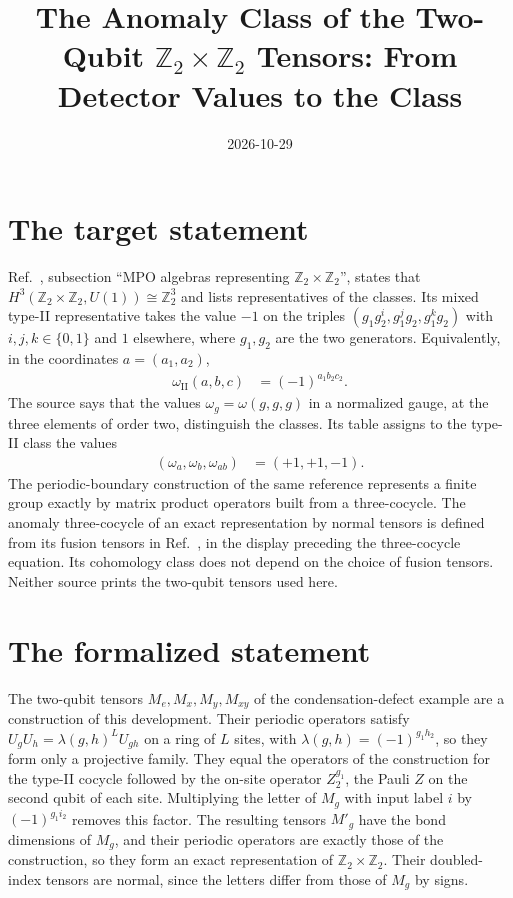 \documentclass{article}
\title{The Anomaly Class of the Two-Qubit $\mathbb{Z}_2\times\mathbb{Z}_2$
Tensors: From Detector Values to the Class}
\author{}
\date{2026-10-29}
\begin{document}
\maketitle
{}

\section{The target statement}

Ref.~\cite{GarreRubio2023MPOSym}, subsection ``MPO algebras representing
$\mathbb{Z}_2\times\mathbb{Z}_2$'', states that
$H^3(\mathbb{Z}_2\times\mathbb{Z}_2,U(1))\cong\mathbb{Z}_2^3$ and lists
representatives of the classes. Its mixed type-II representative takes the
value $-1$ on the triples $(g_1g_2^i,g_1^jg_2,g_1^kg_2)$ with
$i,j,k\in\{0,1\}$ and $1$ elsewhere, where $g_1,g_2$ are the two generators.
Equivalently, in the coordinates $a=(a_1,a_2)$,
\begin{align}
    \omega_{\mathrm{II}}(a,b,c)
     & =(-1)^{a_1b_2c_2}.
    \label{eq:glm23z2z2_type_two_cocycle}
\end{align}
The source says that the values $\omega_g=\omega(g,g,g)$ in a normalized
gauge, at the three elements of order two, distinguish the classes. Its table
assigns to the type-II class the values
\begin{align}
    (\omega_a,\omega_b,\omega_{ab})
     & =(+1,+1,-1).
    \label{eq:glm23z2z2_type_two_detectors}
\end{align} The
periodic-boundary construction of the same reference represents a finite
group exactly by matrix product operators built from a three-cocycle. The
anomaly three-cocycle of an exact representation by normal tensors is
defined from its fusion tensors in Ref.~\cite{FrancoRubio2025MPUGauging}, in
the display preceding the three-cocycle equation. Its cohomology class does
not depend on the choice of fusion tensors. Neither source prints the
two-qubit tensors used here.

\section{The formalized statement}

The two-qubit tensors $M_e,M_x,M_y,M_{xy}$ of the condensation-defect
example are a construction of this development. Their periodic operators
satisfy $U_gU_h=\lambda(g,h)^LU_{gh}$ on a ring of $L$ sites, with
$\lambda(g,h)=(-1)^{g_1h_2}$, so they form only a projective family. They
equal the operators of the construction for the type-II cocycle followed by
the on-site operator $Z_2^{g_1}$, the Pauli $Z$ on the second qubit of each
site. Multiplying the letter of $M_g$ with input label $i$ by $(-1)^{g_1i_2}$
removes this factor. The resulting tensors $M'_g$ have the bond dimensions
of $M_g$, and their periodic operators are exactly those of the
construction, so they form an exact representation of
$\mathbb{Z}_2\times\mathbb{Z}_2$. Their doubled-index tensors are normal,
since the letters differ from those of $M_g$ by signs.
\end{document}
